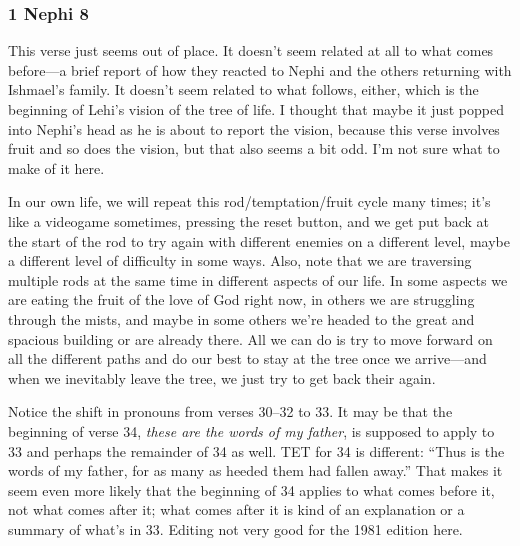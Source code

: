 	\subsubsection{1 Nephi 8} %

		\begin{compactdesc}

		\item[1$\vert$]
		\begin{compactdesc}
		\item[Fit in context?] This verse just seems out of place. It doesn't seem related at all to what comes before---a brief report of how they reacted to Nephi and the others returning with Ishmael's family. It doesn't seem related to what follows, either, which is the beginning of Lehi's vision of the tree of life. I thought that maybe it just popped into Nephi's head as he is about to report the vision, because this verse involves fruit and so does the vision, but that also seems a bit odd. I'm not sure what to make of it here.
		\end{compactdesc}
		
		\item[30$\vert$]
		\begin{compactdesc}
		\item[they did press their way forward...] In our own life, we will repeat this rod/temptation/fruit cycle many times; it's like a videogame sometimes, pressing the reset button, and we get put back at the start of the rod to try again with different enemies on a different level, maybe a different level of difficulty in some ways. Also, note that we are traversing multiple rods at the same time in different aspects of our life. In some aspects we are eating the fruit of the love of God right now, in others we are struggling through the mists, and maybe in some others we're headed to the great and spacious building or are already there. All we can do is try to move forward on all the different paths and do our best to stay at the tree once we arrive---and when we inevitably leave the tree, we just try to get back their again.
		\end{compactdesc}

		\item[30--34$\vert$]
		\begin{compactdesc}
		\item[he...he...his/me...we] Notice the shift in pronouns from verses 30--32 to 33. It may be that the beginning of verse 34, \textit{these are the words of my father}, is supposed to apply to 33 and perhaps the remainder of 34 as well. TET for 34 is different: ``Thus is the words of my father, \textbar for as many as heeded them had fallen away.'' That makes it seem even more likely that the beginning of 34 applies to what comes before it, not what comes after it; what comes after it is kind of an explanation or a summary of what's in 33. Editing not very good for the 1981 edition here. 


\end{compactdesc}
\end{compactdesc}
